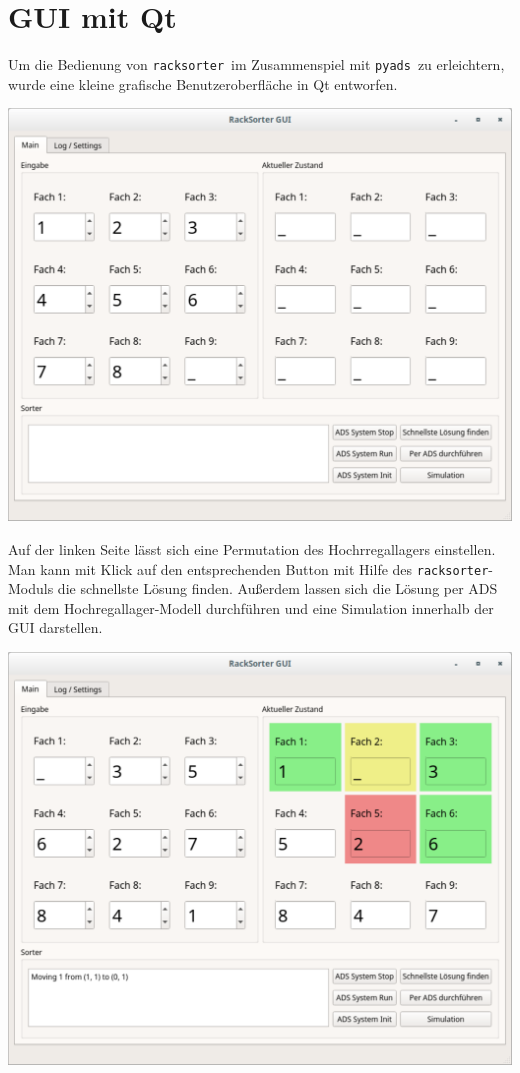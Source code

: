 \documentclass{fh-ium-bama}
\newcommand{\racksorter}{\lstinline|racksorter|}
\newcommand{\pyads}{\lstinline|pyads|}
\begin{document}
\chapter{GUI mit Qt}
Um die Bedienung von \racksorter\ im Zusammenspiel mit \pyads\ zu erleichtern, wurde eine kleine grafische Benutzeroberfläche in Qt entworfen.
\begin{center}
\includegraphics[scale=0.4]{GUI1.pdf}
\end{center}
Auf der linken Seite lässt sich eine Permutation des Hochrregallagers einstellen. Man kann mit Klick auf den entsprechenden Button mit Hilfe des \racksorter-Moduls die schnellste Lösung finden. Außerdem lassen sich die Lösung per ADS mit dem Hochregallager-Modell durchführen und eine Simulation innerhalb der GUI darstellen.
\begin{center}
\includegraphics[scale=0.4]{GUI3.pdf}
\end{center}
\end{document}
